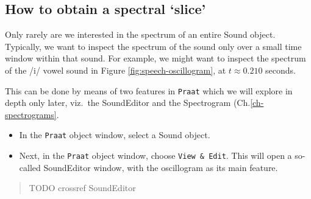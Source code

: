 \documentclass[
]{book}
\begin{document}
\label{box-praatspectralslice}
\subsection{How to obtain a spectral `slice'}\label{sec:spectralslice}

Only rarely are we interested in the spectrum of an entire Sound object. Typically, we want to inspect the spectrum of the sound only over a small time window within that sound. For example, we might want to inspect the spectrum of the /i/ vowel sound in Figure \ref{fig:speech-oscillogram}, at \(t \approx 0.210\) seconds.

This can be done by means of two features in \texttt{Praat} which we will explore in depth only later, viz.~the SoundEditor and the Spectrogram (Ch.\ref{ch-spectrograms}.

\begin{itemize}
\item
  In the \texttt{Praat} object window, select a Sound object.
\item
  Next, in the \texttt{Praat} object window, choose \texttt{View\ \&\ Edit}. This will open a so-called SoundEditor window, with the oscillogram as its main feature.
\end{itemize}

\begin{quote}
TODO crossref SoundEditor
\end{quote}
\end{document}
